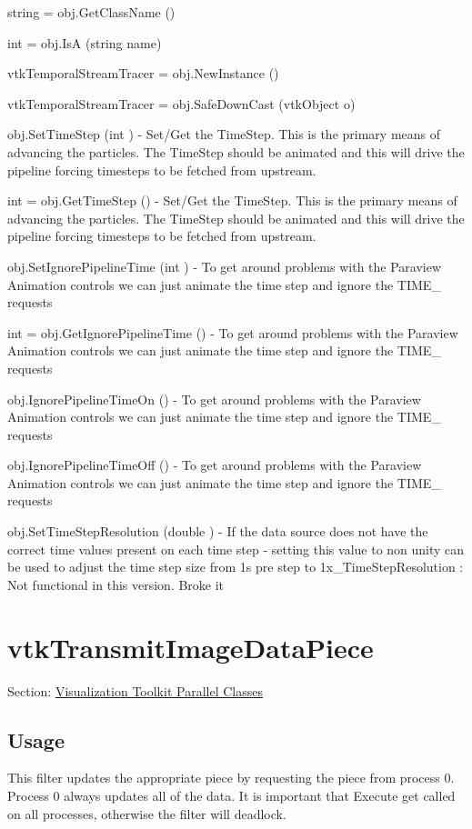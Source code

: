 \begin{DoxyItemize}
\item {\ttfamily string = obj.\-Get\-Class\-Name ()}  
\item {\ttfamily int = obj.\-Is\-A (string name)}  
\item {\ttfamily vtk\-Temporal\-Stream\-Tracer = obj.\-New\-Instance ()}  
\item {\ttfamily vtk\-Temporal\-Stream\-Tracer = obj.\-Safe\-Down\-Cast (vtk\-Object o)}  
\item {\ttfamily obj.\-Set\-Time\-Step (int )} -\/ Set/\-Get the Time\-Step. This is the primary means of advancing the particles. The Time\-Step should be animated and this will drive the pipeline forcing timesteps to be fetched from upstream.  
\item {\ttfamily int = obj.\-Get\-Time\-Step ()} -\/ Set/\-Get the Time\-Step. This is the primary means of advancing the particles. The Time\-Step should be animated and this will drive the pipeline forcing timesteps to be fetched from upstream.  
\item {\ttfamily obj.\-Set\-Ignore\-Pipeline\-Time (int )} -\/ To get around problems with the Paraview Animation controls we can just animate the time step and ignore the T\-I\-M\-E\-\_\- requests  
\item {\ttfamily int = obj.\-Get\-Ignore\-Pipeline\-Time ()} -\/ To get around problems with the Paraview Animation controls we can just animate the time step and ignore the T\-I\-M\-E\-\_\- requests  
\item {\ttfamily obj.\-Ignore\-Pipeline\-Time\-On ()} -\/ To get around problems with the Paraview Animation controls we can just animate the time step and ignore the T\-I\-M\-E\-\_\- requests  
\item {\ttfamily obj.\-Ignore\-Pipeline\-Time\-Off ()} -\/ To get around problems with the Paraview Animation controls we can just animate the time step and ignore the T\-I\-M\-E\-\_\- requests  
\item {\ttfamily obj.\-Set\-Time\-Step\-Resolution (double )} -\/ If the data source does not have the correct time values present on each time step -\/ setting this value to non unity can be used to adjust the time step size from 1s pre step to 1x\-\_\-\-Time\-Step\-Resolution \-: Not functional in this version. Broke it  
\end{DoxyItemize}\hypertarget{vtkparallel_vtktransmitimagedatapiece}{}\section{vtk\-Transmit\-Image\-Data\-Piece}\label{vtkparallel_vtktransmitimagedatapiece}
Section\-: \hyperlink{sec_vtkparallel}{Visualization Toolkit Parallel Classes} \hypertarget{vtkwidgets_vtkxyplotwidget_Usage}{}\subsection{Usage}\label{vtkwidgets_vtkxyplotwidget_Usage}
This filter updates the appropriate piece by requesting the piece from process 0. Process 0 always updates all of the data. It is important that Execute get called on all processes, otherwise the filter will deadlock.

